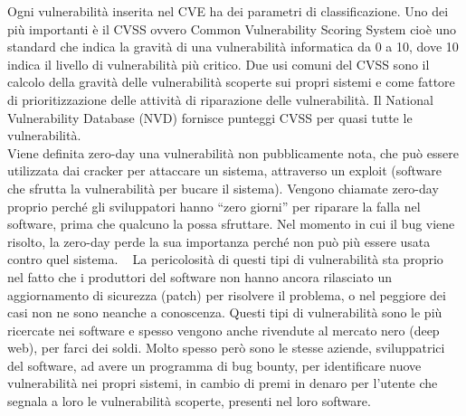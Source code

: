 Ogni vulnerabilità inserita nel CVE ha dei parametri di classificazione. 
Uno dei più importanti è il CVSS ovvero Common Vulnerability Scoring System 
cioè uno standard che indica la gravità di una vulnerabilità informatica 
da 0 a 10, dove 10 indica il livello di vulnerabilità più critico. 
Due usi comuni del CVSS sono il calcolo della gravità delle vulnerabilità 
scoperte sui propri sistemi e come fattore di prioritizzazione delle 
attività di riparazione delle vulnerabilità. Il National Vulnerability 
Database (NVD) fornisce punteggi CVSS per quasi tutte le vulnerabilità.\\

Viene definita zero-day una vulnerabilità non pubblicamente nota, che può 
essere utilizzata dai cracker per attaccare un sistema, attraverso un 
exploit (software che sfrutta la vulnerabilità per bucare il sistema). 
Vengono chiamate zero-day proprio perché gli sviluppatori hanno “zero giorni” 
per riparare la falla nel software, prima che qualcuno la possa sfruttare.
Nel momento in cui il bug viene risolto, la zero-day perde la sua importanza
perché non può più essere usata contro quel sistema. ~\cite{wiki:zero-day}
La pericolosità di questi tipi di vulnerabilità sta proprio nel fatto che i 
produttori del software non hanno ancora rilasciato un aggiornamento di sicurezza 
(patch) per risolvere il problema, o nel peggiore dei casi non ne sono 
neanche a conoscenza. 
Questi tipi di vulnerabilità sono le più ricercate nei software e spesso 
vengono anche rivendute al mercato nero (deep web), per farci dei soldi.
Molto spesso però sono le stesse aziende, sviluppatrici del software, ad avere 
un programma di bug bounty, per identificare nuove vulnerabilità nei propri
sistemi, in cambio di premi in denaro per l’utente che segnala a loro
le vulnerabilità scoperte, presenti nel loro software.
